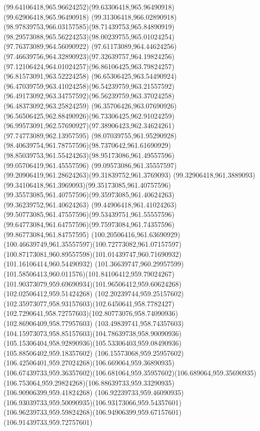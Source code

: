 {{		\curveto(99.64106418,965.96624252)(99.63306418,965.96490918)(99.62906418,965.96490918)
		\curveto(99.31306418,966.02890918)(98.97839753,966.03157585)(98.71439753,965.84890919)
		\curveto(98.29573088,965.56224253)(98.00239755,965.01024254)(97.76373089,964.56090922)
		\curveto(97.61173089,964.44624256)(97.46639756,964.32890923)(97.32639757,964.19824256)
		\curveto(97.12106424,964.01024257)(96.86106425,963.79824257)(96.81573091,963.52224258)
		\curveto(96.65306425,963.54490924)(96.47039759,963.41024258)(96.54239759,963.21557592)
		\curveto(96.49173092,963.34757592)(96.56239759,963.37024258)(96.48373092,963.25824259)
		\curveto(96.35706426,963.07690926)(96.56506425,962.88490926)(96.73306425,962.91024259)
		\curveto(96.99573091,962.57690927)(97.38906423,962.34624261)(97.74773089,962.13957595)
		\curveto(98.07039755,961.95290928)(98.40639754,961.78757596)(98.7370642,961.61690929)
		\curveto(98.85039753,961.55424263)(98.95173086,961.49557596)(99.05706419,961.45557596)
		\curveto(99.09573086,961.35557597)(99.20906419,961.28624263)(99.31839752,961.3769093)
		\curveto(99.32906418,961.3889093)(99.34106418,961.3969093)(99.35173085,961.40757596)
		\curveto(99.35573085,961.40757596)(99.35973085,961.40624263)(99.36239752,961.40624263)
		\curveto(99.44906418,961.41024263)(99.50773085,961.47557596)(99.53439751,961.55557596)
		\curveto(99.64773084,961.64757596)(99.75973084,961.74357596)(99.86773084,961.84757595)
		\curveto(100.20506416,961.63690929)(100.46639749,961.35557597)(100.72773082,961.07157597)
		\curveto(100.87173081,960.89557598)(101.01439747,960.71690932)(101.16106414,960.54490932)
		\curveto(101.36639747,960.29957599)(101.58506413,960.011576)(101.84106412,959.79024267)
		\curveto(101.90373079,959.69690934)(101.96506412,959.60624268)(102.02506412,959.51424268)
		\curveto(102.20239744,959.25157602)(102.35973077,958.93157603)(102.6450641,958.7782427)
		\curveto(102.7290641,958.72757603)(102.80773076,958.74090936)(102.86906409,958.77957603)
		\curveto(103.49839741,958.74357603)(104.15973073,958.85157603)(104.78639738,958.90090936)
		\curveto(105.15306404,958.92890936)(105.53306403,959.08490936)(105.88506402,959.18357602)
		\curveto(106.15573068,959.25957602)(106.42506401,959.27024268)(106.669064,959.36890935)
		\curveto(106.67439733,959.36357602)(106.681064,959.35957602)(106.689064,959.35690935)
		\curveto(106.753064,959.29824268)(106.88639733,959.33290935)(106.90906399,959.41824268)
		\curveto(106.92239733,959.46090935)(106.93039733,959.50090935)(106.93173066,959.54357601)
		\curveto(106.96239733,959.59824268)(106.94906399,959.67157601)(106.91439733,959.72757601)
}}
